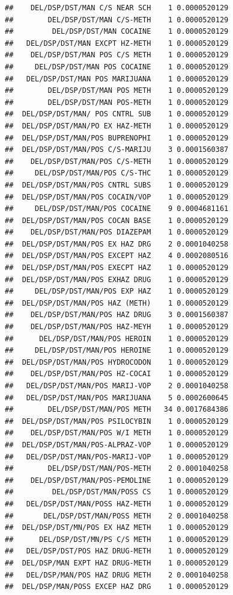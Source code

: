 \documentclass[]{book}
\begin{document}
\begin{verbatim}
##    DEL/DSP/DST/MAN C/S NEAR SCH    1 0.0000520129
##        DEL/DSP/DST/MAN C/S-METH    1 0.0000520129
##         DEL/DSP/DST/MAN COCAINE    1 0.0000520129
##   DEL/DSP/DST/MAN EXCPT HZ-METH    1 0.0000520129
##    DEL/DSP/DST/MAN POS C/S METH    1 0.0000520129
##     DEL/DSP/DST/MAN POS COCAINE    1 0.0000520129
##   DEL/DSP/DST/MAN POS MARIJUANA    1 0.0000520129
##        DEL/DSP/DST/MAN POS METH    1 0.0000520129
##        DEL/DSP/DST/MAN POS-METH    1 0.0000520129
##  DEL/DSP/DST/MAN/ POS CNTRL SUB    1 0.0000520129
##  DEL/DSP/DST/MAN/PO EX HAZ-METH    1 0.0000520129
##  DEL/DSP/DST/MAN/POS BUPRENOPHI    1 0.0000520129
##  DEL/DSP/DST/MAN/POS C/S-MARIJU    3 0.0001560387
##    DEL/DSP/DST/MAN/POS C/S-METH    1 0.0000520129
##     DEL/DSP/DST/MAN/POS C/S-THC    1 0.0000520129
##  DEL/DSP/DST/MAN/POS CNTRL SUBS    1 0.0000520129
##  DEL/DSP/DST/MAN/POS COCAIN/VOP    1 0.0000520129
##     DEL/DSP/DST/MAN/POS COCAINE    9 0.0004681161
##  DEL/DSP/DST/MAN/POS COCAN BASE    1 0.0000520129
##    DEL/DSP/DST/MAN/POS DIAZEPAM    1 0.0000520129
##  DEL/DSP/DST/MAN/POS EX HAZ DRG    2 0.0001040258
##  DEL/DSP/DST/MAN/POS EXCEPT HAZ    4 0.0002080516
##  DEL/DSP/DST/MAN/POS EXECPT HAZ    1 0.0000520129
##  DEL/DSP/DST/MAN/POS EXHAZ DRUG    1 0.0000520129
##     DEL/DSP/DST/MAN/POS EXP HAZ    1 0.0000520129
##  DEL/DSP/DST/MAN/POS HAZ (METH)    1 0.0000520129
##    DEL/DSP/DST/MAN/POS HAZ DRUG    3 0.0001560387
##    DEL/DSP/DST/MAN/POS HAZ-MEYH    1 0.0000520129
##      DEL/DSP/DST/MAN/POS HEROIN    1 0.0000520129
##     DEL/DSP/DST/MAN/POS HEROINE    1 0.0000520129
##  DEL/DSP/DST/MAN/POS HYDROCODON    1 0.0000520129
##    DEL/DSP/DST/MAN/POS HZ-COCAI    1 0.0000520129
##   DEL/DSP/DST/MAN/POS MARIJ-VOP    2 0.0001040258
##   DEL/DSP/DST/MAN/POS MARIJUANA    5 0.0002600645
##        DEL/DSP/DST/MAN/POS METH   34 0.0017684386
##  DEL/DSP/DST/MAN/POS PSILOCYBIN    1 0.0000520129
##    DEL/DSP/DST/MAN/POS W/I METH    1 0.0000520129
##  DEL/DSP/DST/MAN/POS-ALPRAZ-VOP    1 0.0000520129
##   DEL/DSP/DST/MAN/POS-MARIJ-VOP    1 0.0000520129
##        DEL/DSP/DST/MAN/POS-METH    2 0.0001040258
##    DEL/DSP/DST/MAN/POS-PEMOLINE    1 0.0000520129
##         DEL/DSP/DST/MAN/POSS CS    1 0.0000520129
##   DEL/DSP/DST/MAN/POSS HAZ-METH    1 0.0000520129
##       DEL/DSP/DST/MAN/POSS METH    2 0.0001040258
##  DEL/DSP/DST/MN/POS EX HAZ METH    1 0.0000520129
##      DEL/DSP/DST/MN/PS C/S METH    1 0.0000520129
##   DEL/DSP/DST/POS HAZ DRUG-METH    1 0.0000520129
##  DEL/DSP/MAN EXPT HAZ DRUG-METH    1 0.0000520129
##   DEL/DSP/MAN/POS HAZ DRUG METH    2 0.0001040258
##  DEL/DSP/MAN/POSS EXCEP HAZ DRG    1 0.0000520129

\end{verbatim}
\end{document}
